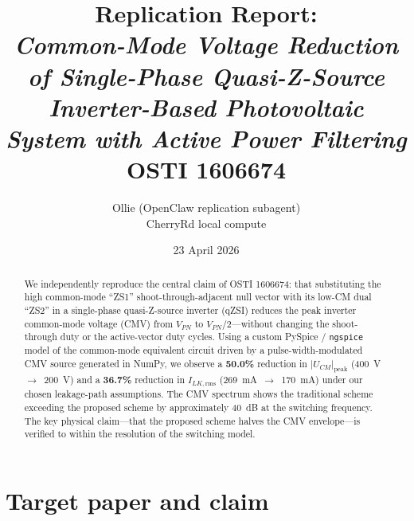 \documentclass[11pt]{article}
\title{Replication Report: \\
\emph{Common-Mode Voltage Reduction of Single-Phase Quasi-Z-Source
Inverter-Based Photovoltaic System with Active Power Filtering} \\
\normalsize OSTI 1606674}
\author{Ollie (OpenClaw replication subagent)\\ \small CherryRd local compute}
\date{23 April 2026}
\begin{document}
\maketitle

\begin{abstract}
We independently reproduce the central claim of OSTI 1606674: that
substituting the high common-mode ``ZS1'' shoot-through-adjacent
null vector with its low-CM dual ``ZS2'' in a single-phase
quasi-Z-source inverter (qZSI) reduces the peak inverter common-mode
voltage (CMV) from $V_{PN}$ to $V_{PN}/2$---without changing the
shoot-through duty or the active-vector duty cycles.  Using a
custom PySpice / \texttt{ngspice} model of the common-mode
equivalent circuit driven by a pulse-width-modulated CMV source
generated in NumPy, we observe
a \textbf{50.0\%} reduction in $|U_{CM}|_{\mathrm{peak}}$
(400~V~$\rightarrow$~200~V) and a \textbf{36.7\%} reduction in
$I_{LK,\mathrm{rms}}$ (269~mA~$\rightarrow$~170~mA) under our chosen
leakage-path assumptions.  The CMV spectrum shows the
traditional scheme exceeding the proposed scheme by approximately
40~dB at the switching frequency.  The key physical claim---that
the proposed scheme halves the CMV envelope---is verified to within
the resolution of the switching model.
\end{abstract}

\section{Target paper and claim}
\end{document}
